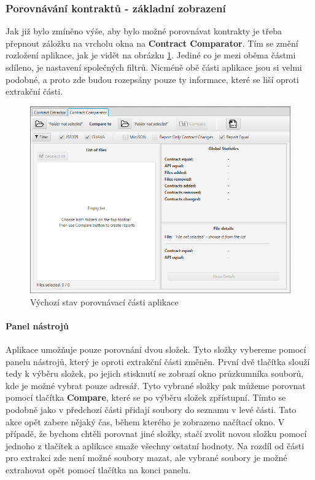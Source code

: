 	
	\subsubsection{Porovnávání kontraktů - základní zobrazení}
		Jak již bylo zmíněno výše, aby bylo možné porovnávat kontrakty je třeba přepnout záložku na vrcholu okna na \textbf{Contract Comparator}. Tím se změní rozložení aplikace, jak je vidět na obrázku \ref{guide06}. Jediné co je mezi oběma částmi sdíleno, je nastavení společných filtrů. Nicméně obě části aplikace jsou si velmi podobné, a proto zde budou rozepsány pouze ty informace, které se liší oproti extrakční části.
		
			\begin{figure}[!htb]
					\centering
					\includegraphics[width=1\textwidth]{img/guide06.png}
					\caption[guide06]{Výchozí stav porovnávací části aplikace}
					\label{guide06}
				\endminipage\hfill
			\end{figure}
		
		\paragraph{Panel nástrojů}	
			Aplikace umožňuje pouze porovnání dvou složek. Tyto složky vybereme pomocí panelu nástrojů, který je oproti extrakční části změněn. První dvě tlačítka slouží tedy k výběru složek, po jejich stisknutí se zobrazí okno průzkumníka souborů, kde je možné vybrat pouze adresář. Tyto vybrané složky pak můžeme porovnat pomocí tlačítka \textbf{Compare}, které se po výběru složek zpřístupní. Tímto se podobně jako v předchozí části přidají soubory do seznamu v levé části. Tato akce opět zabere nějaký čas, během kterého je zobrazeno načítací okno. V případě, že bychom chtěli porovnat jiné složky, stačí zvolit novou složku pomocí jednoho z tlačítek a aplikace smaže všechny ostatní hodnoty. Na rozdíl od části pro extrakci zde není možné soubory mazat, ale vybrané soubory je možné extrahovat opět pomocí tlačítka na konci panelu.\\
		
